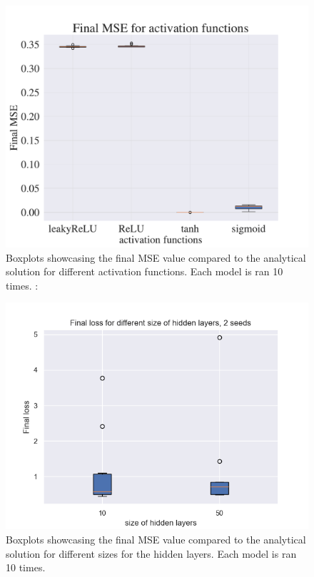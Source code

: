 \begin{figure}[h!]
    \centering
    \includegraphics[width=1.0\linewidth]{project_3/plots/activation_search.pdf}
    \caption{Boxplots showcasing the final MSE value compared to the analytical solution for different activation functions. Each model is ran 10 times. : }
    \label{fig:boxplots_activations}
\end{figure}

\begin{figure}[h!]
    \centering
    \includegraphics[width=1.0\linewidth]{project_3/plots/value_layers_search.png}
    \caption{Boxplots showcasing the final MSE value compared to the analytical solution for different sizes for the hidden layers. Each model is ran 10 times. }
    \label{fig:boxplots_size_of_layers}
\end{figure}

